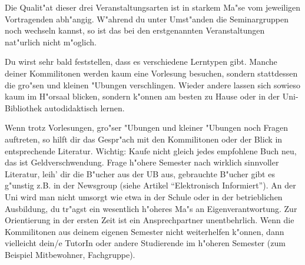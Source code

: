 Die Qualit"at dieser drei Veranstaltungsarten ist in starkem Ma"se vom
jeweiligen Vortragenden abh"angig. W"ahrend du unter Umst"anden die
Seminargruppen noch wechseln kannst, so ist das bei den erstgenannten
Veranstaltungen nat"urlich nicht m"oglich.

Du wirst sehr bald feststellen, dass es verschiedene Lerntypen gibt. Manche
deiner Kommilitonen werden kaum eine Vorlesung besuchen, sondern stattdessen die gro"sen
und kleinen "Ubungen verschlingen. Wieder andere lassen sich sowieso kaum im
H"orsaal blicken, sondern k"onnen am besten zu Hause oder in der Uni-Bibliothek
autodidaktisch lernen.

Wenn trotz Vorlesungen, gro"ser "Ubungen und kleiner "Ubungen noch Fragen
auftreten, so hilft dir das Gespr"ach mit den Kommilitonen oder der Blick in
entsprechende Literatur.
Wichtig: Kaufe nicht gleich jedes empfohlene Buch neu,
das ist Geldverschwendung. Frage h"ohere Semester nach wirklich sinnvoller
Literatur, leih' dir die B"ucher aus der UB aus, gebrauchte B"ucher gibt es
g"unstig z.B. in der Newsgroup  (siehe Artikel
"`Elektronisch Informiert"'). An der Uni wird man nicht umsorgt wie etwa in der
Schule oder in der betrieblichen Ausbildung, du tr"agst ein wesentlich h"oheres
Ma"s an Eigenverantwortung. Zur Orientierung in der ersten Zeit ist ein
Ansprechpartner unentbehrlich. Wenn die Kommilitonen aus
deinem eigenen Semester nicht weiterhelfen k"onnen, dann vielleicht dein/e TutorIn oder andere
Studierende im h"oheren Semester (zum Beispiel Mitbewohner, Fachgruppe).
